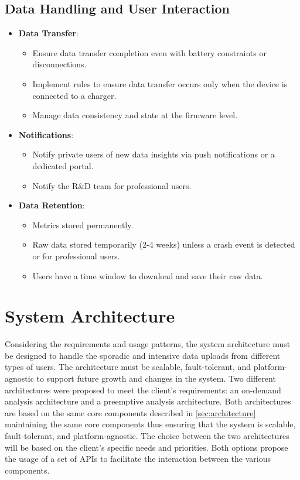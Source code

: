 \subsection*{Data Handling and User Interaction}
\begin{itemize}
    \item \textbf{Data Transfer}:
    \begin{itemize}
        \item Ensure data transfer completion even with battery constraints or disconnections.
        \item Implement rules to ensure data transfer occurs only when the device is connected to a charger.
        \item Manage data consistency and state at the firmware level.
    \end{itemize}
    \item \textbf{Notifications}:
    \begin{itemize}
        \item Notify private users of new data insights via push notifications or a dedicated portal.
        \item Notify the R\&D team for professional users.
    \end{itemize}
    \item \textbf{Data Retention}:
    \begin{itemize}
        \item Metrics stored permanently.
        \item Raw data stored temporarily (2-4 weeks) unless a crash event is detected or for professional users.
        \item Users have a time window to download and save their raw data.
    \end{itemize}
\end{itemize}

\section{System Architecture}
\label{sec:system_architecture}
Considering the requirements and usage patterns, the system architecture must be designed to handle the sporadic and intensive data uploads from different types of users. The architecture must be scalable, fault-tolerant, and platform-agnostic to support future growth and changes in the system. Two different architectures were proposed to meet the client's requirements: an on-demand analysis architecture and a preemptive analysis architecture. Both architectures are based on the same core components described in \ref{sec:architecture} maintaining the same core components thus ensuring that the system is scalable, fault-tolerant, and platform-agnostic. The choice between the two architectures will be based on the client's specific needs and priorities. Both options propose the usage of a set of APIs to facilitate the interaction between the various components.


